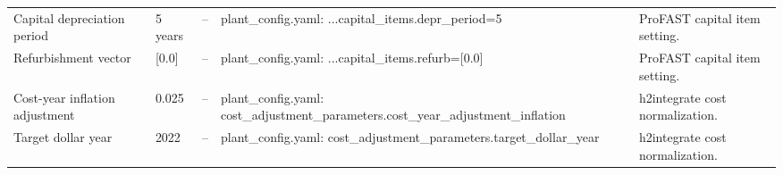 \begin{center}
\begin{longtable}{p{} p{} p{} p{} p{}}
Capital depreciation period & 5 years & -- & plant\_config.yaml: ...capital\_items.depr\_period=5 & ProFAST capital item setting. \\
Refurbishment vector & [0.0] & -- & plant\_config.yaml: ...capital\_items.refurb=[0.0] & ProFAST capital item setting. \\
Cost-year inflation adjustment & 0.025 & -- & plant\_config.yaml: cost\_adjustment\_parameters.cost\_year\_adjustment\_inflation & h2integrate cost normalization. \\
Target dollar year & 2022 & -- & plant\_config.yaml: cost\_adjustment\_parameters.target\_dollar\_year & h2integrate cost normalization. \\

\end{longtable}
\end{center}
